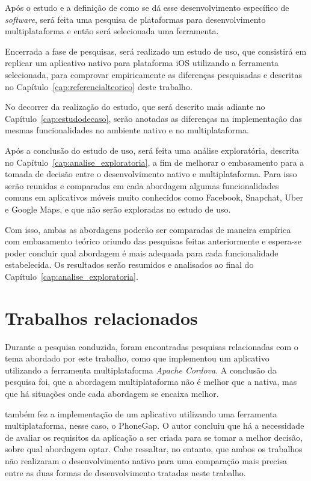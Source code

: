 Após o estudo e a definição de como se dá esse desenvolvimento específico de \textit{software},
será feita uma pesquisa de plataformas para desenvolvimento multiplataforma e então será selecionada uma ferramenta. 

Encerrada a fase de pesquisas, será realizado um estudo de uso, que consistirá em replicar um aplicativo nativo para plataforma iOS utilizando a ferramenta selecionada, 
para comprovar empiricamente as diferenças pesquisadas e descritas no Capítulo~\ref{cap:referencialteorico} deste trabalho.

No decorrer da realização do estudo, que será descrito mais adiante no Capítulo~\ref{cap:estudodecaso}, serão anotadas as diferenças na implementação das mesmas funcionalidades no ambiente nativo e no 
multiplataforma.

Após a conclusão do estudo de uso, será feita uma análise exploratória, descrita no Capítulo~\ref{cap:analise_exploratoria}, 
a fim de melhorar o embasamento para a tomada de decisão entre o desenvolvimento 
nativo e multiplataforma. Para isso serão reunidas e comparadas em cada abordagem algumas funcionalidades comuns em aplicativos 
móveis muito conhecidos como Facebook, Snapchat, Uber e Google Maps, e que não serão exploradas no estudo de uso.

Com isso, ambas as abordagens poderão ser comparadas de maneira empírica com embasamento teórico oriundo das pesquisas feitas anteriormente e espera-se poder concluir qual abordagem é mais adequada para cada funcionalidade 
estabelecida. Os resultados serão resumidos e analisados ao final do Capítulo~\ref{cap:analise_exploratoria}. 

\section{Trabalhos relacionados} \label{sec:trabalhosrelacionados}

Durante a pesquisa conduzida, foram encontradas pesquisas relacionadas com o tema abordado por este trabalho, como 
que implementou um aplicativo utilizando a ferramenta multiplataforma \textit{Apache Cordova}. A conclusão da pesquisa foi, 
que a abordagem multiplataforma não é melhor que a nativa, mas que há situações onde cada abordagem se encaixa melhor.

 também fez a implementação de um aplicativo utilizando uma ferramenta multiplataforma, nesse caso, o PhoneGap. 
O autor concluiu que há a necessidade de avaliar os requisitos da aplicação a ser criada para se tomar a melhor decisão, sobre qual abordagem optar.
Cabe ressaltar, no entanto, que ambos os trabalhos não realizaram o desenvolvimento nativo para uma comparação mais precisa entre as duas formas de desenvolvimento
tratadas neste trabalho. 

